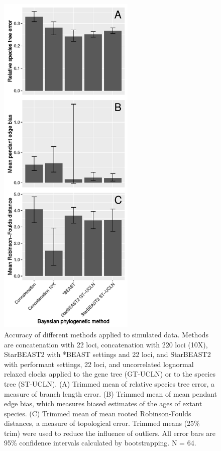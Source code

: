 \documentclass[12pt]{article}
\begin{document}
\begin{figure}[htb!]
\centering
\includegraphics[width=6.5cm]{tree_error.pdf}
\caption
{Accuracy of different methods applied to simulated data. Methods are concatenation with 22 loci, concatenation with 220 loci
(10X), StarBEAST2 with *BEAST settings and 22 loci, and StarBEAST2 with
performant settings, 22 loci, and uncorrelated lognormal relaxed clocks applied
to the gene tree (GT-UCLN) or to the species tree (ST-UCLN). (A) Trimmed mean of
relative species tree error, a measure of branch length error. (B) Trimmed
mean of mean pendant edge bias, which measures biased estimates of the ages of
extant species. (C) Trimmed mean of mean rooted Robinson-Foulds distances, a
measure of topological error. Trimmed means (25\% trim) were used to reduce the
influence of outliers. All error bars are 95\% confidence intervals calculated
by bootstrapping. N = 64.}
\label{fig:speciesTreeError}
\end{figure}

\clearpage
\end{document}
